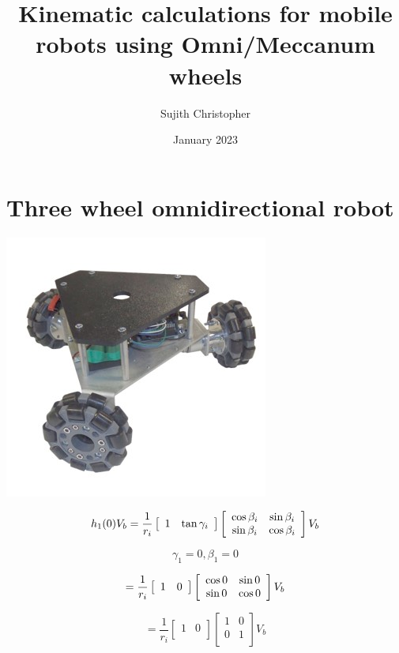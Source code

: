 \documentclass{article}
\title{\textbf{Kinematic calculations for mobile robots using Omni/Meccanum wheels}}
\author{Sujith Christopher}
\date{January 2023}
\begin{document}
\maketitle

\section{Three wheel omnidirectional robot}

\includegraphics{robot_3_omniwheel.jpg}


\begin{equation}
    h_1(0) V_b = \frac{1}{r_i} \left[\begin{array}{cc}
            1 & \tan\gamma_i \\
        \end{array}\right]
    \left[\begin{array}{cc}
            \cos \beta_i    & \sin \beta_i \\
            \- \sin \beta_i & \cos \beta_i \\
        \end{array}\right] V_b
\end{equation}

\begin{equation}
    \gamma_1 = 0, \beta_1 = 0
\end{equation}

\begin{equation}
    = \frac{1}{r_i} \left[\begin{array}{cc}
            1 & 0 \\
        \end{array}\right]
    \left[\begin{array}{cc}
            \cos 0    & \sin 0 \\
            \- \sin 0 & \cos 0 \\
        \end{array}\right] V_b
\end{equation}

\begin{equation}
    = \frac{1}{r_i} \left[\begin{array}{cc}
            1 & 0 \\
        \end{array}\right]
    \left[
        \begin{array}{cc}
            1 & 0 \\
            0 & 1 \\
        \end{array}\right]
    V_b
\end{equation}
\end{document}
